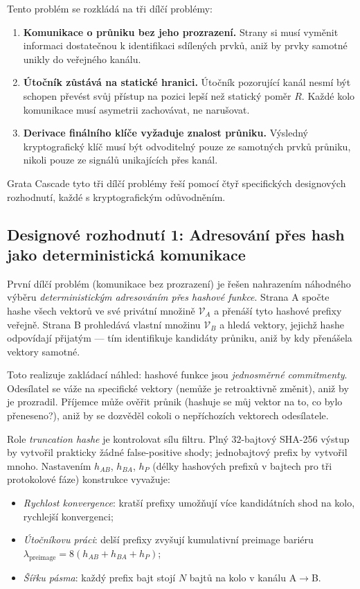 \documentclass[11pt,a4paper]{article}
\begin{document}
Tento problém se rozkládá na tři dílčí problémy:
\begin{enumerate}[leftmargin=*]
\item \textbf{Komunikace o průniku bez jeho prozrazení.} Strany si musí vyměnit informaci dostatečnou k identifikaci sdílených prvků, aniž by prvky samotné unikly do veřejného kanálu.
\item \textbf{Útočník zůstává na statické hranici.} Útočník pozorující kanál nesmí být schopen převést svůj přístup na pozici lepší než statický poměr $R$. Každé kolo komunikace musí asymetrii zachovávat, ne narušovat.
\item \textbf{Derivace finálního klíče vyžaduje znalost průniku.} Výsledný kryptografický klíč musí být odvoditelný pouze ze samotných prvků průniku, nikoli pouze ze signálů unikajících přes kanál.
\end{enumerate}

Grata Cascade tyto tři dílčí problémy řeší pomocí čtyř specifických designových rozhodnutí, každé s kryptografickým odůvodněním.

\subsection{Designové rozhodnutí 1: Adresování přes hash jako deterministická komunikace}

První dílčí problém (komunikace bez prozrazení) je řešen nahrazením náhodného výběru \emph{deterministickým adresováním přes hashové funkce}. Strana A spočte hashe všech vektorů ve své privátní množině $\mathcal{V}_A$ a přenáší tyto hashové prefixy veřejně. Strana B prohledává vlastní množinu $\mathcal{V}_B$ a hledá vektory, jejichž hashe odpovídají přijatým --- tím identifikuje kandidáty průniku, aniž by kdy přenášela vektory samotné.

Toto realizuje zakládací náhled: hashové funkce jsou \emph{jednosměrné commitmenty}. Odesílatel se váže na specifické vektory (nemůže je retroaktivně změnit), aniž by je prozradil. Příjemce může ověřit průnik (hashuje se můj vektor na to, co bylo přeneseno?), aniž by se dozvěděl cokoli o nepříchozích vektorech odesílatele.

Role \emph{truncation hashe} je kontrolovat sílu filtru. Plný $32$-bajtový SHA-256 výstup by vytvořil prakticky žádné false-positive shody; jednobajtový prefix by vytvořil mnoho. Nastavením $h_{AB}$, $h_{BA}$, $h_P$ (délky hashových prefixů v bajtech pro tři protokolové fáze) konstrukce vyvažuje:
\begin{itemize}[leftmargin=*]
\item \emph{Rychlost konvergence}: kratší prefixy umožňují více kandidátních shod na kolo, rychlejší konvergenci;
\item \emph{Útočníkovu práci}: delší prefixy zvyšují kumulativní preimage bariéru $\lambda_\text{preimage} = 8(h_{AB} + h_{BA} + h_P)$;
\item \emph{Šířku pásma}: každý prefix bajt stojí $N$ bajtů na kolo v kanálu A$\to$B.
\end{itemize}
\end{document}
